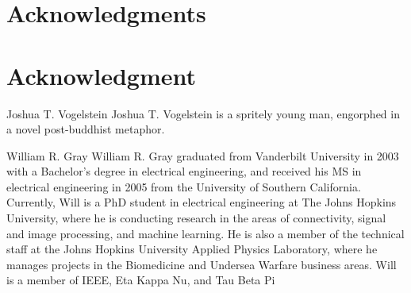 \documentclass[10pt,journal,cspaper,compsoc]{IEEEtran}
\begin{document}
\ifCLASSOPTIONcompsoc
  \section*{Acknowledgments}
\else
  \section*{Acknowledgment}
\fi


\ifCLASSOPTIONcaptionsoff
  \newpage
\fi





\begin{IEEEbiography}{Joshua T. Vogelstein}
Joshua T. Vogelstein is a spritely young man, engorphed in a novel post-buddhist metaphor.

\end{IEEEbiography}

\begin{IEEEbiographynophoto}{William R. Gray}
William R. Gray graduated from Vanderbilt University in 2003 with a Bachelor’s degree in electrical engineering, and received his MS in electrical engineering in 2005 from the University of Southern California.  Currently, Will is a PhD student in electrical engineering at The Johns Hopkins University, where he is conducting research in the areas of connectivity, signal and image processing, and machine learning.  He is also a member of the technical staff at the Johns Hopkins University Applied Physics Laboratory, where he manages projects in the Biomedicine and Undersea Warfare business areas.  Will is a member of IEEE, Eta Kappa Nu, and Tau Beta Pi
\end{IEEEbiographynophoto}

\end{document}
